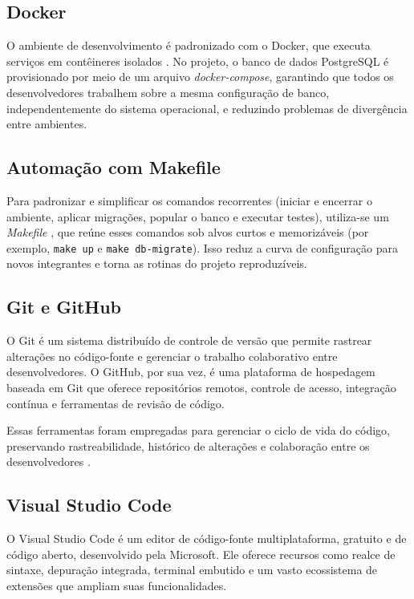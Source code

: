         \subsection{Docker}
        O ambiente de desenvolvimento é padronizado com o Docker, que executa serviços em contêineres isolados \cite{docker_docs}. No projeto, o banco de dados PostgreSQL é provisionado por meio de um arquivo \textit{docker-compose}, garantindo que todos os desenvolvedores trabalhem sobre a mesma configuração de banco, independentemente do sistema operacional, e reduzindo problemas de divergência entre ambientes.

        \subsection{Automação com Makefile}
        Para padronizar e simplificar os comandos recorrentes (iniciar e encerrar o ambiente, aplicar migrações, popular o banco e executar testes), utiliza-se um \textit{Makefile} \cite{gnumake_docs}, que reúne esses comandos sob alvos curtos e memorizáveis (por exemplo, \texttt{make up} e \texttt{make db-migrate}). Isso reduz a curva de configuração para novos integrantes e torna as rotinas do projeto reproduzíveis.

        \subsection{Git e GitHub}
        O Git é um sistema distribuído de controle de versão que permite rastrear alterações no código-fonte e gerenciar o trabalho colaborativo entre desenvolvedores. O GitHub, por sua vez, é uma plataforma de hospedagem baseada em Git que oferece repositórios remotos, controle de acesso, integração contínua e ferramentas de revisão de código.

        Essas ferramentas foram empregadas para gerenciar o ciclo de vida do código, preservando rastreabilidade, histórico de alterações e colaboração entre os desenvolvedores \cite{git_docs,github_version_control}.

        \subsection{Visual Studio Code}
        O Visual Studio Code é um editor de código-fonte multiplataforma, gratuito e de código aberto, desenvolvido pela Microsoft. Ele oferece recursos como realce de sintaxe, depuração integrada, terminal embutido e um vasto ecossistema de extensões que ampliam suas funcionalidades.

